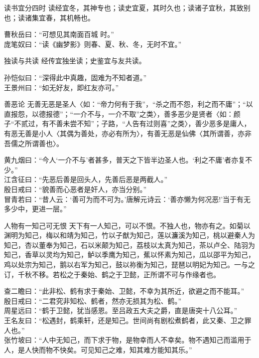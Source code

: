 \begin{yulu}{读书宜分四时}
读经宜冬，其神专也；读史宜夏，其时久也；读诸子宜秋，其致别也；读诸集宜春，其机畅也。
\begin{comments}
曹秋岳曰：“可想见其南面百城 时。” \\
庞笔奴曰：“读《幽梦影》则春、夏、秋、冬，无时不宜。”
\end{comments}
\end{yulu}

\begin{yulu}{独读与共读}
经传宜独坐读；史鉴宜与友共读。
\begin{comments}
孙恺似曰：“深得此中真趣，固难为不知者道。” \\
王景州曰：“如无好友，即红友亦可。”
\end{comments}
\end{yulu}

\begin{yulu}{善恶论}
无善无恶是圣人〈如：“帝力何有于我”，“杀之而不怨，利之而不庸”；“以直报怨，以德报德”；“一介不与，一介不取”之类〉，善多恶少是贤者〈如：颜子“不贰过，有不善未尝不知”；子路，“人告有过则喜”之类〉，善少恶多是庸人，有恶无善是小人〈其偶为善处，亦必有所为〉，有善无恶是仙佛〈其所谓善，亦非吾儒之所谓善也〉。
\begin{comments}
黄九烟曰：“今人‘一介不与’者甚多，普天之下皆半边圣人也。‘利之不庸’者亦复不少。” \\
江含征曰：“先恶后善是回头人，先善后恶是两截人。” \\
殷日戒曰：“貌善而心恶者是奸人，亦当分别。” \\
冒青若曰：“昔人云：‘善可为而不可为。’唐解元诗云：‘善亦懒为何况恶!’当于有无多少中，更进一层。”
\end{comments}
\end{yulu}

\begin{yulu}{人物有一知己可无恨}
天下有一人知己，可以不恨。不独人也，物亦有之。如菊以渊明为知己，梅以和靖为知己，竹以子猷为知己，莲以濂溪为知己，桃以避秦人为知己，杏以董奉为知己，石以米颠为知己，荔枝以太真为知己，茶以卢仝、陆羽为知己，香草以灵均为知己，鲈以季鹰为知己，蕉以怀素为知己，瓜以邵平为知己，鸡以处宗为知己，鹅以右军为知己，鼓以祢衡为知己，琵琶以明妃为知己。一与之订，千秋不移。若松之于秦始、鹤之于卫懿，正所谓不可与作缘者也。
\begin{comments}
查二瞻曰：“此非松、鹤有求于秦始、卫懿，不幸为其所近，欲避之而不能耳。” \\
殷日戒曰：“二君究非知松、鹤者，然亦无损其为松、鹤。” \\
周星远曰：“鹤于卫懿，犹当感恩。至吕政五大夫之爵，直是唐突十八公耳。” \\
王名友曰：“松遇封，鹤乘轩，还是知己。世间尚有剧松煮鹤者，此又秦、卫之罪人也。” \\
张竹坡曰：“人中无知己，而下求于物，是物幸而人不幸矣。物不遇知己而滥用于人，是人快而物不快矣。可见知己之难，知其难方能知其乐。”
\end{comments}
\end{yulu}

